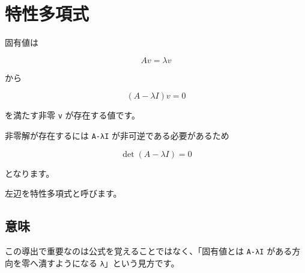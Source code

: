 \documentclass[
  11pt,
  a4paper,
]{ltjsarticle}
\author{}
\date{}
\begin{document}
\hypertarget{ux7279ux6027ux591aux9805ux5f0f}{%
\section{特性多項式}\label{ux7279ux6027ux591aux9805ux5f0f}}

固有値は

\[
Av=\lambda v
\]

から

\[
(A-\lambda I)v=0
\]

を満たす非零 \texttt{v} が存在する値です。

非零解が存在するには \texttt{A-λI} が非可逆である必要があるため

\[
\boxed{\det(A-\lambda I)=0}
\]

となります。

左辺を特性多項式と呼びます。

\hypertarget{ux610fux5473}{%
\subsection{意味}\label{ux610fux5473}}

この導出で重要なのは公式を覚えることではなく、「固有値とは \texttt{A-λI}
がある方向を零へ潰すようになる \texttt{λ}」という見方です。
\end{document}
